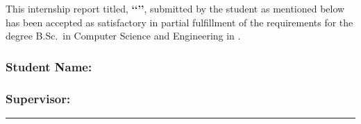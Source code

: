 \bigskip\bigskip
  

  This internship report titled, \textbf{\lq\lq\unskip\rq\rq}, submitted by
  the student as mentioned below has been accepted as satisfactory in
  partial fulfillment of the requirements for the degree B.Sc.\ in
  Computer Science and Engineering in \reportdate.


  \subsubsection*{Student Name:}
  
  \begin{enumerate}
  \end{enumerate}
  
  
  \subsubsection*{Supervisor:}
  \vspace*{15.0mm}

  \hspace*{15.0mm}\begin{minipage}[t]{0.6\textwidth}
    \hrule\medskip
    \par
    \cse\par
    \ndub
  \end{minipage}

